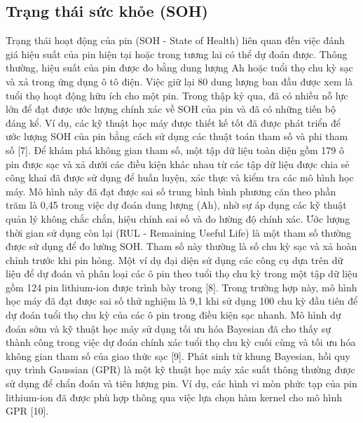 \documentclass[a4paper,13pt]{article}
\theoremstyle{mytheor}
\begin{document}
\subsection{Trạng thái sức khỏe (SOH)}
Trạng thái hoạt động của pin (SOH - State of Health) liên quan đến việc đánh giá hiệu suất của pin hiện tại hoặc trong tương lai có thể dự đoán được. Thông thường, hiệu suất của pin được đo bằng dung lượng Ah hoặc tuổi thọ chu kỳ sạc và xả trong ứng dụng ô tô điện. Việc giữ lại 80 dung lượng ban đầu được xem là tuổi thọ hoạt động hữu ích cho một pin. Trong thập kỷ qua, đã có nhiều nỗ lực lớn để đạt được ước lượng chính xác về SOH của pin và đã có những tiến bộ đáng kể. Ví dụ, các kỹ thuật học máy được thiết kế tốt đã được phát triển để ước lượng SOH của pin bằng cách sử dụng các thuật toán tham số và phi tham số [7]. Để khám phá không gian tham số, một tập dữ liệu toàn diện gồm 179 ô pin được sạc và xả dưới các điều kiện khác nhau từ các tập dữ liệu được chia sẻ công khai đã được sử dụng để huấn luyện, xác thực và kiểm tra các mô hình học máy. Mô hình này đã đạt được sai số trung bình bình phương căn theo phần trăm là 0,45 trong việc dự đoán dung lượng (Ah), nhờ sự áp dụng các kỹ thuật quản lý không chắc chắn, hiệu chỉnh sai số và đo lường độ chính xác. Ước lượng thời gian sử dụng còn lại (RUL - Remaining Useful Life) là một tham số thường được sử dụng để đo lường SOH. Tham số này thường là số chu kỳ sạc và xả hoàn chỉnh trước khi pin hỏng. Một ví dụ đại diện sử dụng các công cụ dựa trên dữ liệu để dự đoán và phân loại các ô pin theo tuổi thọ chu kỳ trong một tập dữ liệu gồm 124 pin lithium-ion được trình bày trong [8]. Trong trường hợp này, mô hình học máy đã đạt được sai số thử nghiệm là 9,1 khi sử dụng 100 chu kỳ đầu tiên để dự đoán tuổi thọ chu kỳ của các ô pin trong điều kiện sạc nhanh. Mô hình dự đoán sớm và kỹ thuật học máy sử dụng tối ưu hóa Bayesian đã cho thấy sự thành công trong việc dự đoán chính xác tuổi thọ chu kỳ cuối cùng và tối ưu hóa không gian tham số của giao thức sạc [9]. Phát sinh từ khung Bayesian, hồi quy quy trình Gaussian (GPR) là một kỹ thuật học máy xác suất thông thường được sử dụng để chẩn đoán và tiên lượng pin. Ví dụ, các hình vi mòn phức tạp của pin lithium-ion đã được phù hợp thông qua việc lựa chọn hàm kernel cho mô hình GPR [10].\\
\end{document}
